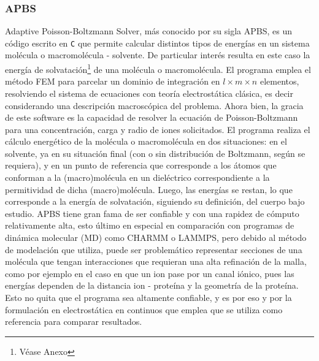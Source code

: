 \documentclass[12pt, notitlepage]{article}
\numberwithin{equation}{section}
\begin{document}
\subsubsection{APBS}
Adaptive Poisson-Boltzmann Solver, más conocido por su sigla APBS, es un código escrito en \texttt{C} que permite calcular distintos tipos de energías en un sistema molécula o macromolécula - solvente. De particular interés resulta en este caso la energía de solvatación\footnote{Véase Anexo} de una molécula o macromolécula. El programa emplea el método FEM para parcelar un dominio de integración en $l\times m\times n$ elementos, resolviendo el sistema de ecuaciones con teoría electrostática clásica, es decir considerando una descripción macroscópica del problema. Ahora bien, la gracia de este software es la capacidad de resolver la ecuación de Poisson-Boltzmann para una concentración, carga y radio de iones solicitados. El programa realiza el cálculo energético de la molécula o macromolécula en dos situaciones: en el solvente, ya en su situación final (con o sin distribución de Boltzmann, según se requiera), y en un punto de referencia que corresponde a los átomos que conforman a la (macro)molécula en un dieléctrico correspondiente a la permitividad de dicha (macro)molécula. Luego, las energías se restan, lo que corresponde a la energía de solvatación, siguiendo su definición, del cuerpo bajo estudio. APBS tiene gran fama de ser confiable y con una rapidez de cómputo relativamente alta, esto último en especial en comparación con programas de dinámica molecular (MD) como CHARMM o LAMMPS, pero debido al método de modelación que utiliza, puede ser problemático representar secciones de una molécula que tengan interacciones que requieran una alta refinación de la malla, como por ejemplo en el caso en que un ion pase por un canal iónico, pues las energías dependen de la distancia ion - proteína y la geometría de la proteína. Esto no quita que el programa sea altamente confiable, y es por eso y por la formulación en electrostática en continuos que emplea que se utiliza como referencia para comparar resultados.
\end{document}
